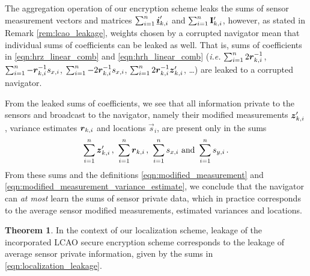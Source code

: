 \documentclass[10pt,letterpaper,oneside,twocolumn,journal]{IEEEtran}
\theoremstyle{definition}
\theoremstyle{definition}
\newtheorem{theorem}{Theorem}[section]
\theoremstyle{remark}
\begin{document}
The aggregation operation of our encryption scheme leaks the sums of sensor measurement vectors and matrices $\sum_{i=1}^n{\boldsymbol{\underline{i}}}'_{k,i}$ and $\sum_{i=1}^n{{\mathbf{I}}}'_{k,i}$, however, as stated in Remark \ref{rem:lcao_leakage}, weights chosen by a corrupted navigator mean that individual sums of coefficients can be leaked as well. That is, sums of coefficients in \eqref{eqn:hrz_linear_comb} and \eqref{eqn:hrh_linear_comb} (\textit{i.e.} $\sum_{i=1}^n2{\boldsymbol{r}}^{-1}_{k,i}$, $\sum_{i=1}^n-{\boldsymbol{r}}^{-1}_{k,i}s_{x,i}$, $\sum_{i=1}^n-2{\boldsymbol{r}}^{-1}_{k,i}s_{x,i}$, $\sum_{i=1}^n2{\boldsymbol{r}}^{-1}_{k,i}{\boldsymbol{z}}'_{k,i}$, \dots) are leaked to a corrupted navigator.

From the leaked sums of coefficients, we see that all information private to the sensors and broadcast to the navigator, namely their modified measurements ${\boldsymbol{z}}'_{k,i}$, variance estimates ${\boldsymbol{r}}_{k,i}$ and locations $\vec{s}_i$, are present only in the sums
\begin{equation}
    \sum_{i=1}^n\rv{z}'_{k,i}\,,\ \sum_{i=1}^n\rv{r}_{k,i}\,,\ \sum_{i=1}^ns_{x,i}\ \textrm{and}\ \sum_{i=1}^ns_{y,i}\,.\label{eqn:localization_leakage}
\end{equation}
From these sums and the definitions \eqref{eqn:modified_measurement} and \eqref{eqn:modified_measurement_variance_estimate}, we conclude that the navigator can \textit{at most} learn the sums of sensor private data, which in practice corresponds to the average sensor modified measurements, estimated variances and locations.
\begin{theorem}
    In the context of our localization scheme, leakage of the incorporated LCAO secure encryption scheme corresponds to the leakage of average sensor private information, given by the sums in \eqref{eqn:localization_leakage}.
\end{theorem}

% 
%                                                                          
%                                                                          
%                                                                          
% 
\end{document}
